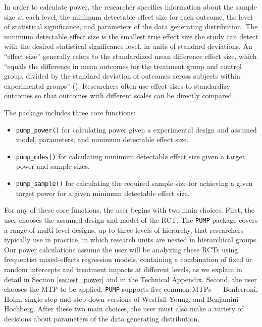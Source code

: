 \documentclass[
]{jss}
\providecommand{\tightlist}{%
  \setlength{\itemsep}{0pt}\setlength{\parskip}{0pt}}
\begin{document}
In order to calculate power, the researcher specifies information about
the sample size at each level, the minimum detectable effect size for
each outcome, the level of statistical significance, and parameters of
the data generating distribution. The minimum detectable effect size is
the smallest true effect size the study can detect with the desired
statistical significance level, in units of standard deviations. An
``effect size'' generally refers to the standardized mean difference
effect size, which ``equals the difference in mean outcomes for the
treatment group and control group, divided by the standard deviation of
outcomes across subjects within experimental groups'' (\citet{RN27978}).
Researchers often use effect sizes to standardize outcomes so that
outcomes with different scales can be directly compared.

The package includes three core functions:

\begin{itemize}
\tightlist
\item
  \texttt{pump\_power()} for calculating power given a experimental
  design and assumed model, parameters, and minimum detectable effect
  size.
\item
  \texttt{pump\_mdes()} for calculating minimum detectable effect size
  given a target power and sample sizes.
\item
  \texttt{pump\_sample()} for calculating the required sample size for
  achieving a given target power for a given minimum detectable effect
  size.
\end{itemize}

For any of these core functions, the user begins with two main choices.
First, the user chooses the assumed design and model of the RCT. The
\texttt{PUMP} package covers a range of multi-level designs, up to three
levels of hierarchy, that researchers typically use in practice, in
which research units are nested in hierarchical groups. Our power
calculations assume the user will be analyzing these RCTs using
frequentist mixed-effects regression models, containing a combination of
fixed or random intercepts and treatment impacts at different levels, as
we explain in detail in Section \ref{sec:est_power} and in the Technical
Appendix. Second, the user chooses the MTP to be applied. \texttt{PUMP}
supports five common MTPs --- Bonferroni, Holm, single-step and
step-down versions of Westfall-Young, and Benjamini-Hochberg. After
these two main choices, the user must also make a variety of decisions
about parameters of the data generating distribution.
\end{document}
